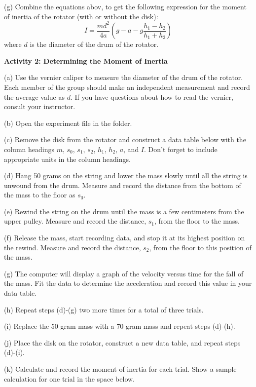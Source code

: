 (g) Combine the equations abov, to get the following expression for the moment
of inertia of the rotator (with or without the disk): 
\[
I=\frac{md^{2}}{4a}\left( g-a-g\frac{h_{1}-h_{2}}{h_{1}+h_{2}}\right) \]
where $d$ is the diameter of the drum of the rotator.
\answerspace{40mm}

\pagebreak[2]
\textbf{Activity 2: Determining the Moment of Inertia }

(a) Use the vernier caliper to measure the diameter of the drum of the rotator.
Each member of the group should make an independent measurement and record the
average value as $d$. If you have questions about how to read the vernier, consult
your instructor.
\answerspace{10mm}

(b) Open the  experiment file in the \filename{\coursefolder} folder.

(c) Remove the disk from the rotator and construct a data table below with the
column headings $m$, \( s_{0} \), \( s_{1} \), \( s_{2} \), \( h_{1} \), 
\( h_{2} \),
$a$, and $I$. Don't forget to include appropriate units in the column headings.
\answerspace{100mm}

(d) Hang 50 grams on the string and lower the mass slowly until all the string
is unwound from the drum. Measure and record the distance from the bottom of
the mass to the floor as \( s_{0} \).

(e) Rewind the string on the drum until the mass is a few centimeters from the
upper pulley. Measure and record the distance, \( s_{1} \), from the floor
to the mass.

(f) Release the mass, start recording data, and stop it at its highest position
on the rewind. Measure and record the distance, \( s_{2} \), from the floor
to this position of the mass.

(g) The computer will display a graph of the velocity versus time for the fall
of the mass. Fit the data to determine the acceleration and record this value
in your data table.

(h) Repeat steps (d)-(g) two more times for a total of three trials.

(i) Replace the 50 gram mass with a 70 gram mass and repeat steps (d)-(h).

(j) Place the disk on the rotator, construct a new data table, and repeat steps
(d)-(i).
\vspace{100mm}

(k) Calculate and record the moment of inertia for each trial. Show a sample
calculation for one trial in the space below.
\vspace{30mm}

